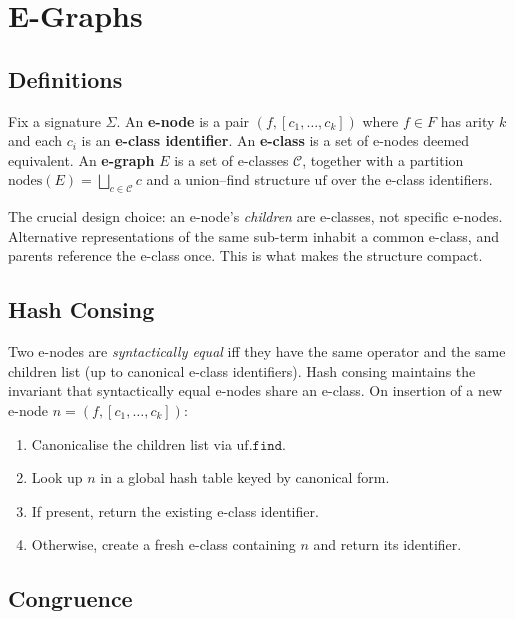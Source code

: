 \documentclass[11pt,a4paper]{article}
\begin{document}
\section{E-Graphs}\label{sec:egraph}

\subsection{Definitions}\label{sec:egraph-def}

Fix a signature $\Sigma$. An \textbf{e-node} is a pair $(f, [c_1, \ldots, c_k])$ where $f \in F$ has arity $k$ and each $c_i$ is an \textbf{e-class identifier}. An \textbf{e-class} is a set of e-nodes deemed equivalent. An \textbf{e-graph} $E$ is a set of e-classes $\mathcal{C}$, together with a partition $\mathrm{nodes}(E) = \bigsqcup_{c \in \mathcal{C}} c$ and a union--find structure $\mathrm{uf}$ over the e-class identifiers.

The crucial design choice: an e-node's \emph{children} are e-classes, not specific e-nodes. Alternative representations of the same sub-term inhabit a common e-class, and parents reference the e-class once. This is what makes the structure compact.

\subsection{Hash Consing}\label{sec:hashcons}

Two e-nodes are \emph{syntactically equal} iff they have the same operator and the same children list (up to canonical e-class identifiers). Hash consing maintains the invariant that syntactically equal e-nodes share an e-class. On insertion of a new e-node $n = (f, [c_1, \ldots, c_k])$:
\begin{enumerate}
\item Canonicalise the children list via $\mathrm{uf}.\mathtt{find}$.
\item Look up $n$ in a global hash table keyed by canonical form.
\item If present, return the existing e-class identifier.
\item Otherwise, create a fresh e-class containing $n$ and return its identifier.
\end{enumerate}

\subsection{Congruence}\label{sec:congruence}
\end{document}
